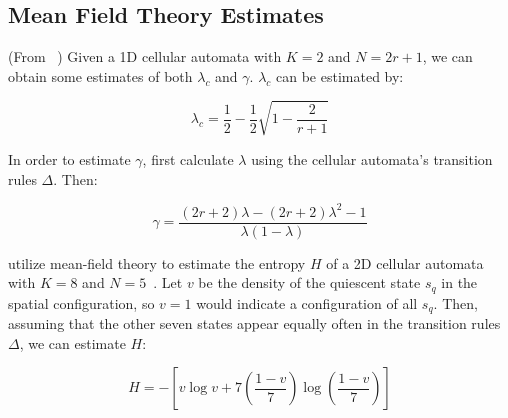 \documentclass[a4paper,11pt]{report}
\begin{document}
\begin{appendices}
\section{Mean Field Theory Estimates}
\label{appA:MFT}
(From \citeauthor{li90b}~\cite{li90b}) Given a 1D cellular automata with $K=2$ and $N = 2r+1$, we can obtain some estimates of both $\lambda_c$ and $\gamma$. $\lambda_c$ can be estimated by:

\begin{equation}
\lambda_c = \frac{1}{2} - \frac{1}{2}\sqrt{1 - \frac{2}{r+1}}
\end{equation}

In order to estimate $\gamma$, first calculate $\lambda$ using the cellular automata's transition rules $\Delta$. Then:

\begin{equation}
\gamma = \frac{(2r+2)\lambda - (2r + 2)\lambda^2 - 1}{\lambda(1-\lambda)}
\end{equation}

\pagebreak

\citeauthor{wo90} utilize mean-field theory to estimate the entropy $H$ of a 2D cellular automata with $K=8$ and $N=5$~\cite{wo90}. Let $v$ be the density of the quiescent state $s_q$ in the spatial configuration, so $v=1$ would indicate a configuration of all $s_q$. Then, assuming that the other seven states appear equally often in the transition rules $\Delta$, we can estimate $H$:

\begin{equation}
H = -\left[ v \log v + 7\left(\frac{1-v}{7}\right)\log\left(\frac{1-v}{7}\right)\right]
\end{equation}

\end{appendices}



\end{document}
